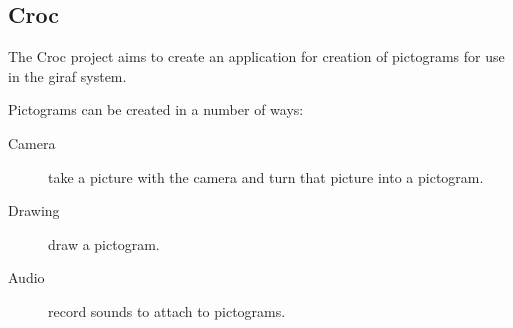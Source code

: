 \subsection{Croc}
\label{sub:Croc}

The Croc project aims to create an application for creation of pictograms for use in the \ac{giraf} system.

\begin{description}
\item  Pictograms can be created in a number of ways:
  \begin{description}
  \item[Camera] take a picture with the camera and turn that picture into a pictogram.
  \item[Drawing] draw a pictogram.
  \item[Audio] record sounds to attach to pictograms.
  \end{description}
\end{description}
